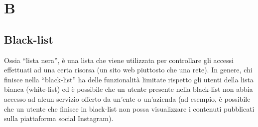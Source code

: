 \section{B}

\subsection{Black-list} Ossia “lista nera”, è una lista che viene utilizzata per controllare gli accessi effettuati ad una certa risorsa (un sito web piuttosto che una rete). In genere, chi finisce nella “black-list” ha delle funzionalità limitate rispetto gli utenti della lista bianca (white-list) ed è possibile che un utente presente nella black-list non abbia accesso ad alcun servizio offerto da un’ente o un’azienda (ad esempio, è possibile che un utente che finisce in black-list non possa visualizzare i contenuti pubblicati sulla piattaforma social Instagram). 

\clearpage